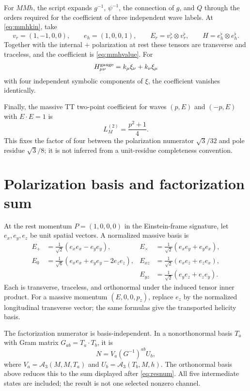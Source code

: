 \documentclass[11pt]{article}
\theoremstyle{definition}
\theoremstyle{remark}
\begin{document}
For $MMh$, the script expands $g^{-1}$, $\psi^{-1}$, the connection of
$g$, and $Q$ through the orders required for the coefficient of three
independent wave labels.  At \eqref{eq:mmhkin}, take
\begin{equation}
v_r=(1,-1,0,0),\qquad e_h=(1,0,0,1),
\qquad E_r=v_r^\flat\otimes v_r^\flat,
\qquad H=e_h^\flat\otimes e_h^\flat.
\end{equation}
Together with the internal $+$ polarization at rest these tensors are
transverse and traceless, and the coefficient is \eqref{eq:mmhvalue}.
For
\begin{equation}
H^{\rm gauge}_{\mu\nu}=k_\mu\xi_\nu+k_\nu\xi_\mu
\end{equation}
with four independent symbolic components of $\xi$, the coefficient
vanishes identically.

Finally, the massive TT two-point coefficient for waves $(p,E)$ and
$(-p,E)$ with $E\cdot E=1$ is
\begin{equation}
L_M^{(2)}=\frac{p^2+1}{4}.
\end{equation}
This fixes the factor of four between the polarization numerator
$\sqrt3/32$ and pole residue $\sqrt3/8$; it is not inferred from a
unit-residue completeness convention.

\section{Polarization basis and factorization sum}
\label{app:polarizations}

At the rest momentum $P=(1,0,0,0)$ in the Einstein-frame signature,
let $e_x,e_y,e_z$ be unit spatial vectors.  A normalized massive basis is
\begin{align}
E_+&=\frac1{\sqrt2}(e_xe_x-e_ye_y),
&E_\times&=\frac1{\sqrt2}(e_xe_y+e_ye_x),\nonumber\\
E_0&=\frac1{\sqrt6}(e_xe_x+e_ye_y-2e_ze_z),
&E_{xz}&=\frac1{\sqrt2}(e_xe_z+e_ze_x),\nonumber\\
&&E_{yz}&=\frac1{\sqrt2}(e_ye_z+e_ze_y).
\end{align}
Each is transverse, traceless, and orthonormal under the induced tensor
inner product.  For a massive momentum $(E,0,0,p_z)$, replace $e_z$ by
the normalized longitudinal transverse vector; the same formulas give
the transported helicity basis.

The factorization numerator is basis-independent.  In a nonorthonormal
basis $T_a$ with Gram matrix $G_{ab}=T_a\cdot T_b$, it is
\begin{equation}
N=V_a(G^{-1})^{ab}U_b,
\end{equation}
where $V_a=\mathcal A_3(M,M,T_a)$ and
$U_b=\mathcal A_3(T_b,M,h)$.  The orthonormal basis above reduces this
to the sum displayed after \eqref{eq:resnum}.  All five intermediate
states are included; the result is not one selected nonzero channel.
\end{document}
